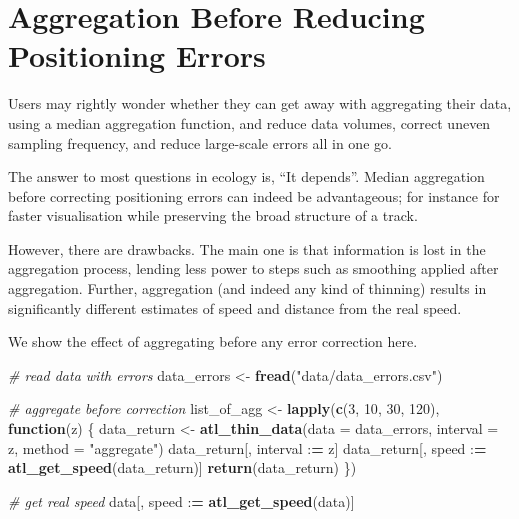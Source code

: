 \documentclass[
]{scrreprt}
\newenvironment{Shaded}{}{}
\newcommand{\CommentTok}[1]{\textcolor[rgb]{0.38,0.63,0.69}{\textit{#1}}}
\newcommand{\ControlFlowTok}[1]{\textcolor[rgb]{0.00,0.44,0.13}{\textbf{#1}}}
\newcommand{\DataTypeTok}[1]{\textcolor[rgb]{0.56,0.13,0.00}{#1}}
\newcommand{\DecValTok}[1]{\textcolor[rgb]{0.25,0.63,0.44}{#1}}
\newcommand{\ErrorTok}[1]{\textcolor[rgb]{1.00,0.00,0.00}{\textbf{#1}}}
\newcommand{\KeywordTok}[1]{\textcolor[rgb]{0.00,0.44,0.13}{\textbf{#1}}}
\newcommand{\NormalTok}[1]{#1}
\newcommand{\OperatorTok}[1]{\textcolor[rgb]{0.40,0.40,0.40}{#1}}
\newcommand{\StringTok}[1]{\textcolor[rgb]{0.25,0.44,0.63}{#1}}
\begin{document}
\hypertarget{aggregation-before-reducing-positioning-errors}{%
\section{Aggregation Before Reducing Positioning Errors}\label{aggregation-before-reducing-positioning-errors}}

Users may rightly wonder whether they can get away with aggregating their data, using a median aggregation function, and reduce data volumes, correct uneven sampling frequency, and reduce large-scale errors all in one go.

The answer to most questions in ecology is, ``It depends''. Median aggregation before correcting positioning errors can indeed be advantageous; for instance for faster visualisation while preserving the broad structure of a track.

However, there are drawbacks. The main one is that information is lost in the aggregation process, lending less power to steps such as smoothing applied after aggregation.
Further, aggregation (and indeed any kind of thinning) results in significantly different estimates of speed and distance from the real speed.

We show the effect of aggregating before any error correction here.

\begin{Shaded}
\begin{Highlighting}[]
\CommentTok{\# read data with errors}
\NormalTok{data\_errors <{-}}\StringTok{ }\KeywordTok{fread}\NormalTok{(}\StringTok{"data/data\_errors.csv"}\NormalTok{)}
  
\CommentTok{\# aggregate before correction}
\NormalTok{list\_of\_agg <{-}}\StringTok{ }\KeywordTok{lapply}\NormalTok{(}\KeywordTok{c}\NormalTok{(}\DecValTok{3}\NormalTok{, }\DecValTok{10}\NormalTok{, }\DecValTok{30}\NormalTok{, }\DecValTok{120}\NormalTok{), }\ControlFlowTok{function}\NormalTok{(z) \{}
\NormalTok{  data\_return <{-}}\StringTok{ }\KeywordTok{atl\_thin\_data}\NormalTok{(}\DataTypeTok{data =}\NormalTok{ data\_errors,}
                            \DataTypeTok{interval =}\NormalTok{ z,}
                            \DataTypeTok{method =} \StringTok{"aggregate"}\NormalTok{)}
\NormalTok{  data\_return[, interval }\OperatorTok{:}\ErrorTok{=}\StringTok{ }\NormalTok{z]}
\NormalTok{  data\_return[, speed }\OperatorTok{:}\ErrorTok{=}\StringTok{ }\KeywordTok{atl\_get\_speed}\NormalTok{(data\_return)]}
  \KeywordTok{return}\NormalTok{(data\_return)}
\NormalTok{\})}

\CommentTok{\# get real speed}
\NormalTok{data[, speed }\OperatorTok{:}\ErrorTok{=}\StringTok{ }\KeywordTok{atl\_get\_speed}\NormalTok{(data)]}
\end{Highlighting}
\end{Shaded}
\end{document}
